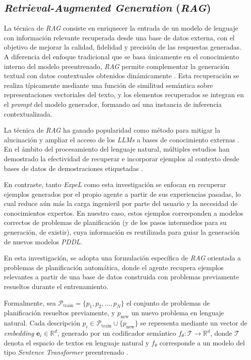 \subsection{\textit{Retrieval-Augmented Generation} (\textit{RAG})}

La técnica de \textit{RAG} consiste en enriquecer la entrada de un modelo de lenguaje con información relevante recuperada desde una base de datos externa, con el objetivo de mejorar la calidad, fidelidad y precisión de las respuestas generadas. A diferencia del enfoque tradicional que se basa únicamente en el conocimiento interno del modelo preentrenado, \textit{RAG} permite complementar la generación textual con datos contextuales obtenidos dinámicamente \parencite{li2022survey}. Esta recuperación se realiza típicamente mediante una función de similitud semántica sobre representaciones vectoriales del texto, y los elementos recuperados se integran en el \textit{prompt} del modelo generador, formando así una instancia de inferencia contextualizada.

La técnica de \textit{RAG} ha ganado popularidad como método para mitigar la alucinación y ampliar el acceso de los \textit{LLMs} a bases de conocimiento externas \parencite{li2022survey}. En el ámbito del procesamiento del lenguaje natural, múltiples estudios han demostrado la efectividad de recuperar e incorporar ejemplos al contexto desde bases de datos de demostraciones etiquetadas \parencite{wang2023learning, rubin2021learning}.

En contraste, tanto \textit{ExpeL} como esta investigación se enfocan en recuperar ejemplos generados por el propio agente a partir de sus experiencias pasadas, lo cual reduce aún más la carga ingenieril por parte del usuario y la necesidad de conocimientos expertos. En nuestro caso, estos ejemplos corresponden a modelos correctos de problemas de planificación (y de los pasos intermedios para su generación, de existir), cuya información es reutilizada para guiar la generación de nuevos modelos \textit{PDDL}.

En esta investigación, se adopta una formulación específica de \textit{RAG} orientada a problemas de planificación automática, donde el agente recupera ejemplos relevantes a partir de una base de datos construida con problemas previamente resueltos durante el entrenamiento.

Formalmente, sea \( \mathcal{P}_{\text{train}} = \{p_1, p_2, \dots, p_N\} \) el conjunto de problemas de planificación resueltos previamente, y \( p_{\text{new}} \) un nuevo problema en lenguaje natural. Cada descripción \( p_i \in \mathcal{P}_{\text{train}} \cup \{p_{\text{new}}\} \) se representa mediante un vector de \textit{embedding} \( \mathbf{e}_i \in \mathbb{R}^d \), generado por un codificador semántico \( f_{\theta} \colon \mathcal{T} \rightarrow \mathbb{R}^d \), donde \( \mathcal{T} \) denota el espacio de textos en lenguaje natural y \( f_{\theta} \) corresponde a un modelo del tipo \textit{Sentence Transformer} preentrenado \parencite{reimers2019sentence}.

